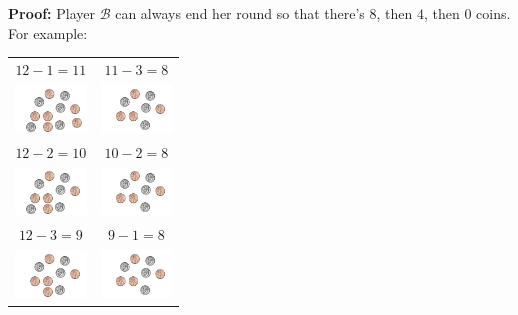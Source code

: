 \documentclass{beamer}
\theoremstyle{theorem}
\theoremstyle{definition}
\newcommand{\<}{\langle}
\renewcommand{\>}{\rangle}
\newcommand{\pl}[1]{\mathscr{#1}}
\newcommand{\vpause}{\pause\vspace{1em}}
\begin{document}
\begin{frame}
  \textbf{Proof:} Player $\pl B$ can always end her round so that there's $8$,
  then $4$, then $0$ coins. For example:

  \vpause

  {\small \begin{center}\begin{tabular}{cc}
    $12-1=11$ & $11-3=8$ \\
    \includegraphics[height=0.5in]{takeawayCoins/11.pdf} &
    \includegraphics[height=0.5in]{takeawayCoins/08.pdf} \vspace{1em}\\

    $12-2=10$ & $10-2=8$ \\
    \includegraphics[height=0.5in]{takeawayCoins/10.pdf} &
    \includegraphics[height=0.5in]{takeawayCoins/08.pdf} \vspace{1em}\\

    $12-3=9$ & $9-1=8$ \\
    \includegraphics[height=0.5in]{takeawayCoins/09.pdf} &
    \includegraphics[height=0.5in]{takeawayCoins/08.pdf} \\
  \end{tabular}\end{center} }

\end{frame}
\end{document}
